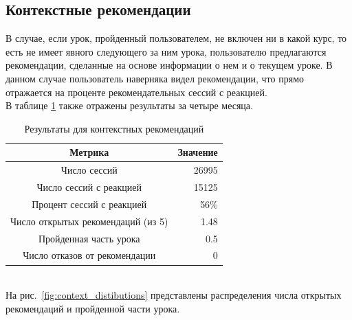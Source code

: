\documentclass[14pt]{matmex-diploma}
\begin{document}
\subsection{Контекстные рекомендации}
\indent В случае, если урок, пройденный пользователем, не включен ни в какой курс, то есть не имеет явного следующего за ним урока, пользователю предлагаются рекомендации, сделанные на основе информации о нем и о текущем уроке. В данном случае пользователь наверняка видел рекомендации, что прямо отражается на проценте рекомендательных сессий с реакцией.
\\\indent В таблице \ref{tabular:table_context} также отражены результаты за четыре месяца.

\begin{table}[h]
    \caption{Результаты для контекстных рекомендаций}
    \label{tabular:table_context}
    
    \begin{center}
    \begin{tabular}{ c | r }
      \hline
      Метрика & Значение \\
      \hline	
      \hline
      Число сессий & 26995 \\
      Число сессий с реакцией & 15125 \\
      Процент сессий с реакцией &  56\% \\
      Число открытых рекомендаций (из 5) & 1.48 \\
      Пройденная часть урока & 0.5 \\
      Число отказов от рекомендации & 0 \\
      \hline  
    \end{tabular}
    \end{center}
\end{table}


\\\indent На рис.~\ref{fig:context_distibutions} представлены распределения числа открытых рекомендаций и пройденной части урока.
\end{document}
